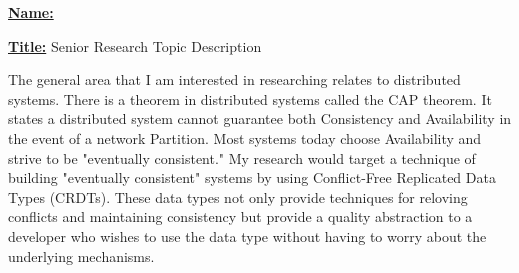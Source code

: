 \documentclass{article}
\author{Ryan Bruno}
\date{\today}
\renewcommand{\maketitle}{
\textbf{\underline{Name:}}
\theauthor

\textbf{\underline{Title:}}
Senior Research Topic Description
}
\begin{document}
\maketitle


\setlength{\parindent}{10ex}
The general area that I am interested in researching relates to distributed systems. There is a theorem in distributed systems called the CAP theorem. It states a distributed system cannot guarantee both Consistency and Availability in the event of a network Partition. Most systems today choose Availability and strive to be "eventually consistent." My research would target a technique of building "eventually consistent" systems by using Conflict-Free Replicated Data Types (CRDTs). These data types not only provide techniques for reloving conflicts and maintaining consistency but provide a quality abstraction to a developer who wishes to use the data type without having to worry about the underlying mechanisms.
\end{document}
